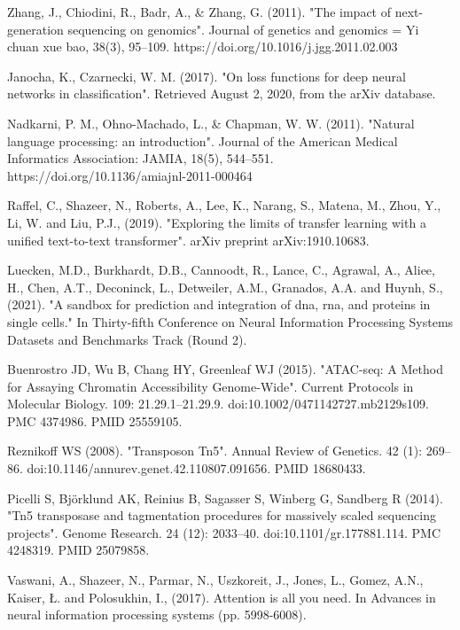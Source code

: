 \begin{thebibliography}{25}

 Zhang, J., Chiodini, R., Badr, A., \& Zhang, G. (2011). "The impact of next-generation sequencing on genomics". Journal of genetics and genomics = Yi chuan xue bao, 38(3), 95–109. https://doi.org/10.1016/j.jgg.2011.02.003

 Janocha, K., Czarnecki, W. M. (2017). "On loss functions for deep neural networks in classification". Retrieved August 2, 2020, from the arXiv database.

 Nadkarni, P. M., Ohno-Machado, L., \& Chapman, W. W. (2011). "Natural language processing: an introduction". Journal of the American Medical Informatics Association: JAMIA, 18(5), 544–551. https://doi.org/10.1136/amiajnl-2011-000464

 Raffel, C., Shazeer, N., Roberts, A., Lee, K., Narang, S., Matena, M., Zhou, Y., Li, W. and Liu, P.J., (2019). "Exploring the limits of transfer learning with a unified text-to-text transformer". arXiv preprint arXiv:1910.10683.

 Luecken, M.D., Burkhardt, D.B., Cannoodt, R., Lance, C., Agrawal, A., Aliee, H., Chen, A.T., Deconinck, L., Detweiler, A.M., Granados, A.A. and Huynh, S., (2021). "A sandbox for prediction and integration of dna, rna, and proteins in single cells." In Thirty-fifth Conference on Neural Information Processing Systems Datasets and Benchmarks Track (Round 2).

 Buenrostro JD, Wu B, Chang HY, Greenleaf WJ (2015). "ATAC-seq: A Method for Assaying Chromatin Accessibility Genome-Wide". Current Protocols in Molecular Biology. 109: 21.29.1–21.29.9. doi:10.1002/0471142727.mb2129s109. PMC 4374986. PMID 25559105.

 Reznikoff WS (2008). "Transposon Tn5". Annual Review of Genetics. 42 (1): 269–86. doi:10.1146/annurev.genet.42.110807.091656. PMID 18680433.

 Picelli S, Björklund AK, Reinius B, Sagasser S, Winberg G, Sandberg R (2014). "Tn5 transposase and tagmentation procedures for massively scaled sequencing projects". Genome Research. 24 (12): 2033–40. doi:10.1101/gr.177881.114. PMC 4248319. PMID 25079858.

 Vaswani, A., Shazeer, N., Parmar, N., Uszkoreit, J., Jones, L., Gomez, A.N., Kaiser, Ł. and Polosukhin, I., (2017). Attention is all you need. In Advances in neural information processing systems (pp. 5998-6008).


\end{thebibliography}
